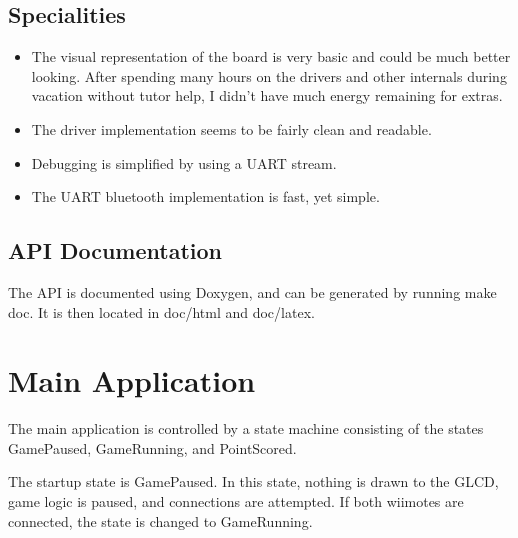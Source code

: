 \documentclass[12pt,a4paper,titlepage,oneside]{article}
\begin{document}
\subsection{Specialities}

\begin{itemize}
 \item  The visual representation of the board is very basic and could be much better looking. After spending
many hours on the drivers and other internals during vacation without tutor help, I didn't have much
energy remaining for extras.

 \item The driver implementation seems to be fairly clean and readable.
 
 \item Debugging is simplified by using a UART stream. 
 
 \item The UART bluetooth implementation is fast, yet simple.
 
\end{itemize}



\subsection{API Documentation}

The API is documented using Doxygen, and can be generated by running make doc.
It is then located in doc/html and doc/latex.


\section{Main Application}

The main application is controlled by a state machine consisting of the states 
GamePaused, GameRunning, and PointScored.


The startup state is GamePaused. In this state, nothing is drawn to the GLCD,
game logic is paused, and connections are attempted.
If both wiimotes are connected,
the state is changed to GameRunning.
\end{document}
